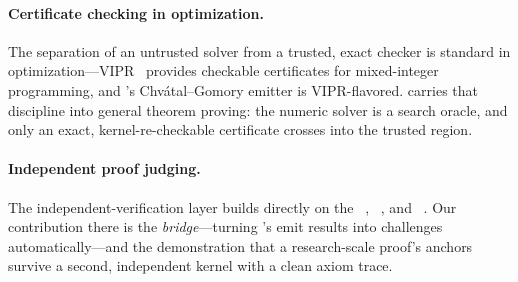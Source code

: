 \paragraph{Certificate checking in optimization.} The separation of an untrusted
solver from a trusted, exact checker is standard in optimization---VIPR~\cite{vipr}
provides checkable certificates for mixed-integer programming, and \Telperion's
Chv\'atal--Gomory emitter is VIPR-flavored. \Telperion{} carries that discipline
into general theorem proving: the numeric solver is a search oracle, and only an
exact, kernel-re-checkable certificate crosses into the trusted region.

\paragraph{Independent proof judging.} The independent-verification layer builds
directly on the \Comparator~\cite{comparator}, ~\cite{lean4export},
and \nanoda~\cite{nanoda}. Our contribution there is the \emph{bridge}---turning
\Telperion's emit results into \Comparator{} challenges automatically---and the
demonstration that a research-scale proof's anchors survive a second, independent
kernel with a clean axiom trace.
